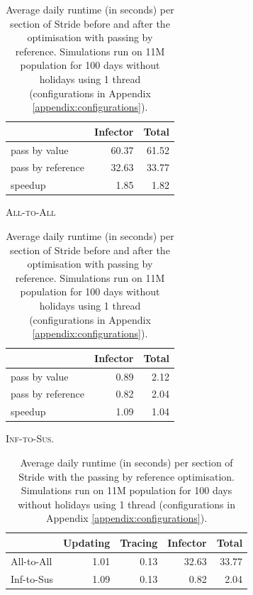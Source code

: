 \begin{table}[!ht]
    \begin{subtable}[h]{0.45\textwidth}
        \centering
        \begin{tabular}{@{}lrr@{}}
            \toprule
             & Infector & Total \\ \midrule
            pass by value & 60.37 & 61.52 \\
            pass by reference & 32.63 & 33.77 \\ \hdashline[1pt/1pt]
            speedup & 1.85 & 1.82 \\ \bottomrule
        \end{tabular}
        \caption{\textsc{All-to-All}}
        \label{tab:basis_standard_all}
    \end{subtable}
    \hfill
    \begin{subtable}[h]{0.45\textwidth}
        \centering
        \begin{tabular}{@{}lrr@{}}
            \toprule
             & Infector & Total \\ \midrule
            pass by value & 0.89 & 2.12 \\
            pass by reference & 0.82 & 2.04 \\ \hdashline[1pt/1pt]
            speedup & 1.09 & 1.04 \\ \bottomrule
        \end{tabular}
        \caption{\textsc{Inf-to-Sus}.}
        \label{tab:basis_standard_opt}
    \end{subtable}
    \caption{Average daily runtime (in seconds) per section of Stride before and after the optimisation with passing by reference. Simulations run on 11M population for 100 days without holidays using 1 thread (configurations in Appendix \ref{appendix:configurations}).}
    \label{tab:basis_standard}
\end{table}

\begin{table}[!ht]
\centering
\begin{tabular}{@{}lrrrr@{}}
\toprule
 & Updating & Tracing & Infector & Total \\ \midrule
All-to-All & 1.01 & 0.13 & 32.63 & 33.77 \\
Inf-to-Sus & 1.09 & 0.13 & 0.82 & 2.04 \\ \bottomrule
\end{tabular}
\caption{Average daily runtime (in seconds) per section of Stride with the passing by reference optimisation. Simulations run on 11M population for 100 days without holidays using 1 thread (configurations in Appendix \ref{appendix:configurations}).}
\label{tab:standard_sections}
\end{table}

